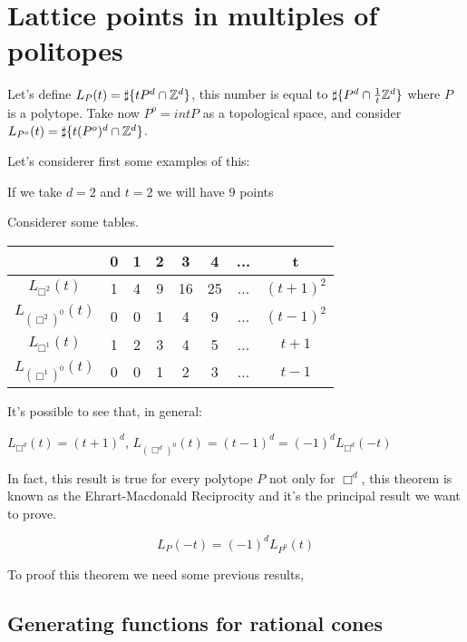 \chapter{Lattice points in multiples of politopes}


Let's define $L_P(t)= \sharp \{tP^{d} \cap \mathbb{Z} ^{d} \}$, this number is equal to $\sharp\{P^{d} \cap \frac{1}{t} \mathbb{Z} ^{d}\}$ where $P$ is a polytope.
Take now $P^{o}=int P$ as a topological space, and consider $L_{P^{o}}(t)= \sharp \{t(P^{o})^{d} \cap \mathbb{Z} ^{d} \}$.

Let's considerer first some examples of this:

If we take $d=2$ and $t=2$ we will have $9$ points

Considerer some tables.

\begin{table}[ht]
\centering
\begin{tabular}{c|c|c|c|c|c|c|c}
 & 0 & 1 & 2 & 3 & 4 & ... & t \\
 \hline
$L_{\Box^2}(t)$ & 1 & 4 & 9 & 16 & 25 & ... & $(t+1)^{2}$\\
\hline
$L_{(\Box^2)^0}(t)$  & 0 & 0 & 1 & 4 & 9 & ... & $(t-1)^{2}$\\
\hline
$L_{\Box^1}(t)$ & 1 & 2 & 3 & 4 & 5 & ... & $t+1$ \\
\hline
$L_{(\Box^1)^0}(t)$ & 0 & 0 & 1 & 2 & 3 & ... & $t-1$ \\
\end{tabular}
\end{table}

It's possible to see that, in general:

\begin{theorem}
$L_{\Box^d}(t) = (t+1)^{d}$, $L_{(\Box^d)^0}(t)=(t-1)^{d}=(-1)^{d}L_{\Box^d}(-t)$
\end{theorem}

In fact, this result is true for every polytope $P$ not only for $\Box^d$, this theorem is known as the Ehrart-Macdonald Reciprocity and it's the principal result we want to prove.

\begin{theorem}
\[
  L_P(-t) = (-1)^d L_{P^0}(t)
\]
\end{theorem}

To proof this theorem we need some previous results,

\section{Generating functions for rational cones}

